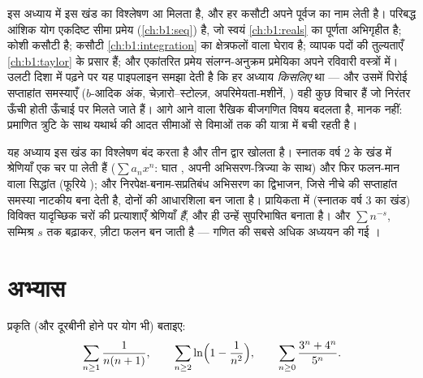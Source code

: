\begin{remark}[विश्लेषण की पाइपलाइन, पीछे मुड़कर]
इस अध्याय में इस खंड का विश्लेषण आ मिलता है, और हर कसौटी अपने पूर्वज का नाम
लेती है। परिबद्ध आंशिक योग एकदिष्ट सीमा प्रमेय (\cref{ch:b1:seq}) है, जो
स्वयं \cref{ch:b1:reals} का पूर्णता अभिगृहीत है;  कोशी कसौटी
है;  कसौटी \cref{ch:b1:integration} का क्षेत्रफलों वाला घेराव है;
व्यापक पदों की तुल्यताएँ \cref{ch:b1:taylor} के प्रसार हैं; और एकांतरित
प्रमेय संलग्न-अनुक्रम प्रमेयिका अपने रविवारी वस्त्रों में। उलटी दिशा में
पढ़ने पर यह पाइपलाइन समझा देती है कि हर अध्याय \emph{किसलिए} था --- और उसमें
पिरोई सप्ताहांत समस्याएँ ($b$-आदिक अंक, चेज़ारो--स्टोल्ज़, अपरिमेयता-मशीनें,
) वही कुछ विचार हैं जो निरंतर ऊँची होती ऊँचाई पर मिलते जाते हैं।
आगे आने वाला रैखिक बीजगणित विषय बदलता है, मानक नहीं: प्रमाणित त्रुटि के साथ
यथार्थ  की आदत सीमाओं से विमाओं तक की यात्रा में बची रहती है।
\end{remark}

\begin{remark}[श्रेणियाँ आगे कहाँ जाती हैं]
यह अध्याय इस खंड का विश्लेषण बंद करता है और तीन द्वार खोलता है। स्नातक वर्ष
2 के खंड में श्रेणियाँ एक चर पा लेती हैं ($\sum a_n x^n$: घात , अपनी
अभिसरण-त्रिज्या के साथ) और फिर फलन-मान वाला सिद्धांत (फूरिये ); और
निरपेक्ष-बनाम-सप्रतिबंध अभिसरण का द्विभाजन, जिसे नीचे की सप्ताहांत समस्या
नाटकीय बना देती है, दोनों की आधारशिला बन जाता है। प्रायिकता में (स्नातक वर्ष
3 का खंड) विविक्त यादृच्छिक चरों की प्रत्याशाएँ श्रेणियाँ \emph{हैं}, और
 ही उन्हें सुपरिभाषित बनाता है। और  $\sum
n^{-s}$, सम्मिश्र $s$ तक बढ़ाकर, ज़ीटा फलन बन जाती है --- गणित की सबसे अधिक
अध्ययन की गई ।
\end{remark}

\section{अभ्यास}

\begin{exercise}[$\star$]\label{exo:b1:series:1}
प्रकृति (और दूरबीनी होने पर योग भी) बताइए:
\[
\sum_{n\geq1} \frac{1}{n(n+1)},
\qquad
\sum_{n\geq2} \ln\Bigl(1 - \frac{1}{n^2}\Bigr),
\qquad
\sum_{n\geq0} \frac{3^n + 4^n}{5^n} .
\]
\end{exercise}

